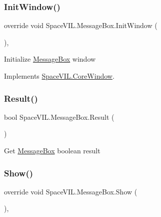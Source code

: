 \subsubsection{\texorpdfstring{Init\+Window()}{InitWindow()}}
{\footnotesize\ttfamily override void Space\+V\+I\+L.\+Message\+Box.\+Init\+Window (\begin{DoxyParamCaption}{ }\end{DoxyParamCaption})\hspace{0.3cm}{\ttfamily [inline]}, {\ttfamily [virtual]}}



Initialize \mbox{\hyperlink{class_space_v_i_l_1_1_message_box}{Message\+Box}} window 



Implements \mbox{\hyperlink{class_space_v_i_l_1_1_core_window_aa3cf4ac54d9651b1149584dc81042824}{Space\+V\+I\+L.\+Core\+Window}}.

\mbox{\label{class_space_v_i_l_1_1_message_box_a9f0785f2987c4aa2aa1efb2c7323e3c2}} 
\subsubsection{\texorpdfstring{Result()}{Result()}}
{\footnotesize\ttfamily bool Space\+V\+I\+L.\+Message\+Box.\+Result (\begin{DoxyParamCaption}{ }\end{DoxyParamCaption})\hspace{0.3cm}{\ttfamily [inline]}}



Get \mbox{\hyperlink{class_space_v_i_l_1_1_message_box}{Message\+Box}} boolean result 

\mbox{\label{class_space_v_i_l_1_1_message_box_a2d2963f79fd8eb73c03872eee52b4331}} 
\subsubsection{\texorpdfstring{Show()}{Show()}}
{\footnotesize\ttfamily override void Space\+V\+I\+L.\+Message\+Box.\+Show (\begin{DoxyParamCaption}{ }\end{DoxyParamCaption})\hspace{0.3cm}{\ttfamily [inline]}, {\ttfamily [virtual]}}



